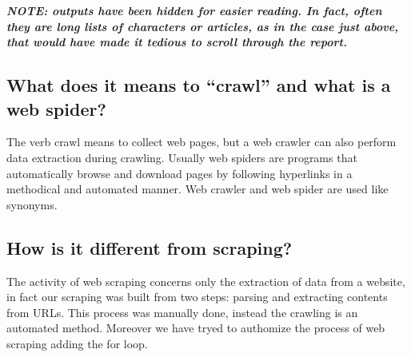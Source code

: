 \documentclass[
]{article}
\newenvironment{Shaded}{\begin{snugshade}}{\end{snugshade}}
\newcommand{\ControlFlowTok}[1]{\textcolor[rgb]{0.13,0.29,0.53}{\textbf{#1}}}
\newcommand{\DataTypeTok}[1]{\textcolor[rgb]{0.13,0.29,0.53}{#1}}
\newcommand{\DecValTok}[1]{\textcolor[rgb]{0.00,0.00,0.81}{#1}}
\newcommand{\KeywordTok}[1]{\textcolor[rgb]{0.13,0.29,0.53}{\textbf{#1}}}
\newcommand{\NormalTok}[1]{#1}
\newcommand{\OperatorTok}[1]{\textcolor[rgb]{0.81,0.36,0.00}{\textbf{#1}}}
\newcommand{\StringTok}[1]{\textcolor[rgb]{0.31,0.60,0.02}{#1}}
\begin{document}
\begin{Shaded}
\end{Shaded}

\textbf{\emph{NOTE: outputs have been hidden for easier reading. In
fact, often they are long lists of characters or articles, as in the
case just above, that would have made it tedious to scroll through the
report.}}

\hypertarget{what-does-it-means-to-crawl-and-what-is-a-web-spider}{%
\subsection{What does it means to ``crawl'' and what is a web
spider?}\label{what-does-it-means-to-crawl-and-what-is-a-web-spider}}

The verb crawl means to collect web pages, but a web crawler can also
perform data extraction during crawling. Usually web spiders are
programs that automatically browse and download pages by following
hyperlinks in a methodical and automated manner. Web crawler and web
spider are used like synonyms.

\hypertarget{how-is-it-different-from-scraping}{%
\subsection{How is it different from
scraping?}\label{how-is-it-different-from-scraping}}

The activity of web scraping concerns only the extraction of data from a
website, in fact our scraping was built from two steps: parsing and
extracting contents from URLs. This process was manually done, instead
the crawling is an automated method. Moreover we have tryed to authomize
the process of web scraping adding the for loop.
\end{document}

